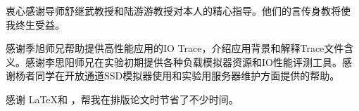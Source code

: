 \begin{acknowledgement}
  衷心感谢导师舒继武教授和陆游游教授对本人的精心指导。他们的言传身教将使
  我终生受益。

  感谢季旭师兄帮助提供高性能应用的IO Trace，介绍应用背景和解释Trace文件含义。感谢李思阳师兄在实验初期提供各种负载模拟器资源和IO性能评测工具。感谢杨者同学在开放通道SSD模拟器使用和实验用服务器维护方面提供的帮助。

  感谢 \LaTeX 和 \thuthesis，帮我在排版论文时节省了不少时间。
\end{acknowledgement}
